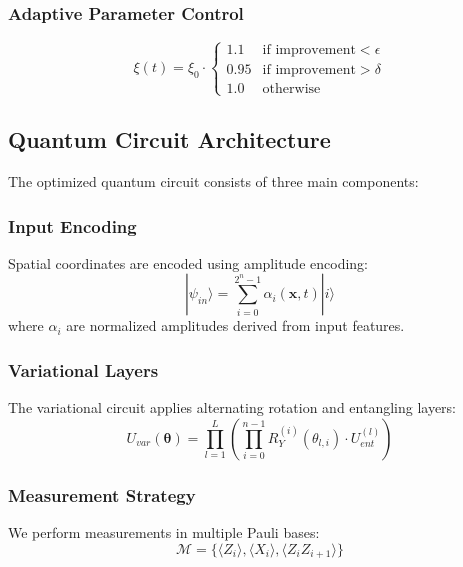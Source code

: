 \documentclass[11pt,a4paper,uplatex,dvipdfmx]{jsarticle}
\begin{document}
\subsubsection{Adaptive Parameter Control}
\begin{equation}
    \xi(t) = \xi_0 \cdot \begin{cases}
        1.1 & \text{if improvement} < \epsilon \\
        0.95 & \text{if improvement} > \delta \\
        1.0 & \text{otherwise}
    \end{cases}
\end{equation}

\subsection{Quantum Circuit Architecture}

The optimized quantum circuit consists of three main components:

\subsubsection{Input Encoding}
Spatial coordinates are encoded using amplitude encoding:
\begin{equation}
    |\psi_{in}\rangle = \sum_{i=0}^{2^n-1} \alpha_i(\mathbf{x}, t) |i\rangle
\end{equation}
where $\alpha_i$ are normalized amplitudes derived from input features.

\subsubsection{Variational Layers}
The variational circuit applies alternating rotation and entangling layers:
\begin{equation}
    U_{var}(\boldsymbol{\theta}) = \prod_{l=1}^{L} \left( \prod_{i=0}^{n-1} R_Y^{(i)}(\theta_{l,i}) \cdot U_{ent}^{(l)} \right)
\end{equation}

\subsubsection{Measurement Strategy}
We perform measurements in multiple Pauli bases:
\begin{equation}
    \mathcal{M} = \{\langle Z_i \rangle, \langle X_i \rangle, \langle Z_i Z_{i+1} \rangle\}
\end{equation}
\end{document}
